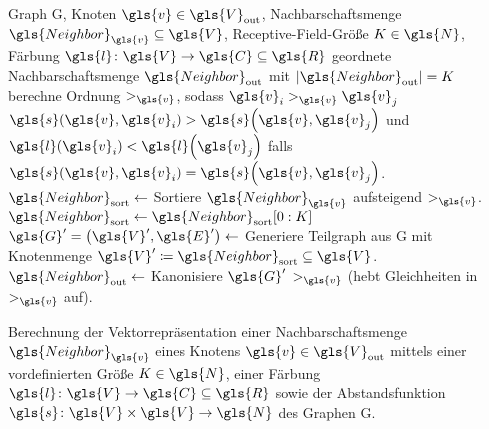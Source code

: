 \begin{algorithm}[t]
\centering
\begin{algorithmic}
  \REQUIRE{} Graph \gls{G}, Knoten $\gls{v} \in \gls{V}_{\mathrm{out}}$, Nachbarschaftsmenge $\gls{Neighbor}_{\gls{v}} \subseteq \gls{V}$, Receptive-Field-Größe $K \in \gls{N}$, Färbung $\gls{l} \colon \gls{V} \to \gls{C} \subseteq \gls{R}$
  \ENSURE{} geordnete Nachbarschaftsmenge $\gls{Neighbor}_{\mathrm{out}}$ mit $\left|\gls{Neighbor}_{\mathrm{out}}\right| = K$
  \STATE{} berechne Ordnung $>_{\gls{v}}$, sodass $\gls{v}_i >_{\gls{v}} \gls{v}_j$ \gdw{} $\gls{s}\left(\gls{v}, \gls{v}_i\right) > \gls{s}\left(\gls{v}, \gls{v}_j\right)$ und $\gls{l}\left(\gls{v}_i\right) < \gls{l}\left(\gls{v}_j\right)$ falls $\gls{s}\left(\gls{v}, \gls{v}_i\right) = \gls{s}\left(\gls{v}, \gls{v}_j\right)$.
  \STATE{} $\gls{Neighbor}_{\mathrm{sort}} \leftarrow$ Sortiere $\gls{Neighbor}_{\gls{v}}$ aufsteigend \bzgl{} $>_{\gls{v}}$.
    \STATE{} $\gls{Neighbor}_{\mathrm{sort}} \leftarrow \gls{Neighbor}_{\mathrm{sort}}\left[0:K\right]$
  \ENDIF{}
  \STATE{} $\gls{G}^{\prime} = \left(\gls{V}^{\prime}, \gls{E}^{\prime}\right) \leftarrow$ Generiere Teilgraph aus \gls{G} mit Knotenmenge $\gls{V}^{\prime} \coloneqq \gls{Neighbor}_{\mathrm{sort}} \subseteq \gls{V}$.
  \STATE{} $\gls{Neighbor}_{\mathrm{out}} \leftarrow$ Kanonisiere $\gls{G}^{\prime}$ \bzgl{} $>_{\gls{v}}$ (hebt Gleichheiten in $>_{\gls{v}}$ auf).
\end{algorithmic}
\caption[Normalisierung]{Berechnung der Vektorrepräsentation einer Nachbarschaftsmenge $\gls{Neighbor}_{\gls{v}}$ eines Knotens $\gls{v} \in \gls{V}_{\mathrm{out}}$ mittels einer vordefinierten Größe $K \in \gls{N}$, einer Färbung $\gls{l} \colon \gls{V} \to \gls{C} \subseteq \gls{R}$ sowie der Abstandsfunktion $\gls{s} \colon \gls{V} \times \gls{V} \to \gls{N}$ des Graphen \gls{G}.}
\label{alg:normalisierung}
\end{algorithm}

